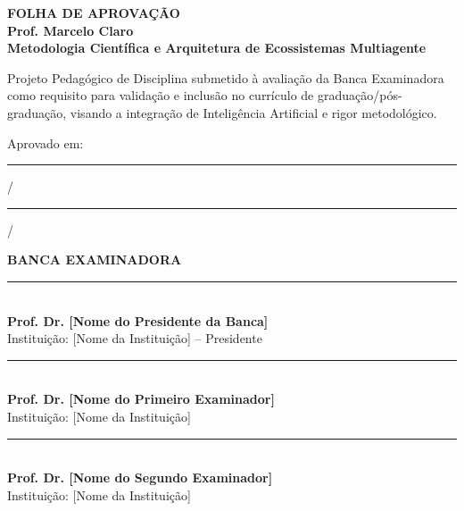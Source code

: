 \documentclass[12pt,a4paper]{article}
\begin{document}
\begin{titlepage}
    \begin{center}
        \vspace*{1cm}
        \Large{\textbf{FOLHA DE APROVAÇÃO}}\\
        \vspace{2cm}
        \textbf{Prof. Marcelo Claro}\\
        \vspace{1cm}
        \textbf{Metodologia Científica e Arquitetura de Ecossistemas Multiagente}
    \end{center}
    
    \vspace{1cm}
    \begin{flushright}
    \begin{minipage}{0.6\textwidth}
    Projeto Pedagógico de Disciplina submetido à avaliação da Banca Examinadora como requisito para validação e inclusão no currículo de graduação/pós-graduação, visando a integração de Inteligência Artificial e rigor metodológico.
    \end{minipage}
    \end{flushright}
    
    \vspace{2cm}
    \noindent Aprovado em: \rule{1cm}{0.1mm} / \rule{1cm}{0.1mm} / \the\year
    
    \vspace{1.5cm}
    \begin{center}
        \textbf{BANCA EXAMINADORA}\\
        \vspace{1.5cm}
        \rule{10cm}{0.1mm}\\
        \textbf{Prof. Dr. [Nome do Presidente da Banca]}\\
        Instituição: [Nome da Instituição] -- Presidente\\
        \vspace{1.5cm}
        \rule{10cm}{0.1mm}\\
        \textbf{Prof. Dr. [Nome do Primeiro Examinador]}\\
        Instituição: [Nome da Instituição]\\
        \vspace{1.5cm}
        \rule{10cm}{0.1mm}\\
        \textbf{Prof. Dr. [Nome do Segundo Examinador]}\\
        Instituição: [Nome da Instituição]
    \end{center}
\end{titlepage}
\end{document}
